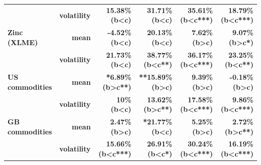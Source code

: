 \documentclass[
  authoryear,
  preprint,
  3p]{elsarticle}
\begin{document}
\begin{longtable}[t]{>{}l>{}r>{}r>{}r>{}r>{}r}
\textbf{} & \textbf{volatility} & \textcolor[HTML]{4285f4}{\textbf{15.38\% (b<c)}} & \textcolor[HTML]{4285f4}{\textbf{31.71\% (b<c)}} & \textcolor[HTML]{4285f4}{\textbf{35.61\% (b<c***)}} & \textcolor[HTML]{4285f4}{\textbf{18.79\% (b<c***)}}\\
\textbf{Zinc (XLME)} & \textbf{mean} & \textcolor[HTML]{4285f4}{\textbf{-4.52\% (b<c)}} & \textcolor[HTML]{4285f4}{\textbf{20.13\% (b<c)}} & \textcolor[HTML]{4285f4}{\textbf{7.62\% (b>c)}} & \textcolor[HTML]{4285f4}{\textbf{9.07\% (b>c*)}}\\
\textbf{} & \textbf{volatility} & \textcolor[HTML]{4285f4}{\textbf{21.73\% (b<c)}} & \textcolor[HTML]{4285f4}{\textbf{38.77\% (b<c**)}} & \textcolor[HTML]{4285f4}{\textbf{36.17\% (b<c***)}} & \textcolor[HTML]{4285f4}{\textbf{23.25\% (b<c**)}}\\
\addlinespace
\textbf{US commodities} & \textbf{mean} & \textcolor[HTML]{4285f4}{\textbf{*6.89\% (b>c**)}} & \textcolor[HTML]{4285f4}{\textbf{**15.89\% (b>c)}} & \textcolor[HTML]{4285f4}{\textbf{9.39\% (b>c)}} & \textcolor[HTML]{4285f4}{\textbf{-0.18\% (b>c)}}\\
\textbf{} & \textbf{volatility} & \textcolor[HTML]{4285f4}{\textbf{10\% (b<c)}} & \textcolor[HTML]{4285f4}{\textbf{13.62\% (b>c**)}} & \textcolor[HTML]{4285f4}{\textbf{17.58\% (b<c***)}} & \textcolor[HTML]{4285f4}{\textbf{9.86\% (b<c***)}}\\
\textbf{GB commodities} & \textbf{mean} & \textcolor[HTML]{4285f4}{\textbf{2.47\% (b>c)}} & \textcolor[HTML]{4285f4}{\textbf{*21.77\% (b<c)}} & \textcolor[HTML]{4285f4}{\textbf{5.25\% (b>c)}} & \textcolor[HTML]{4285f4}{\textbf{2.72\% (b>c**)}}\\
\textbf{} & \textbf{volatility} & \textcolor[HTML]{4285f4}{\textbf{15.66\% (b<c***)}} & \textcolor[HTML]{4285f4}{\textbf{26.91\% (b<c*)}} & \textcolor[HTML]{4285f4}{\textbf{30.24\% (b<c***)}} & \textcolor[HTML]{4285f4}{\textbf{16.19\% (b<c***)}}\\
\bottomrule

\end{longtable}

\endgroup{}

\newpage

\begingroup\fontsize{7}{9}\selectfont
\end{document}
